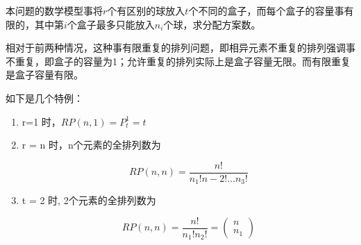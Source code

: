 \documentclass{article}
\begin{document}
本问题的数学模型事将$r$个有区别的球放入$t$个不同的盒子，而每个盒子的容量事有限的，其中第$i$个盒子最多只能放入$n_i$个球，求分配方案数。

相对于前两种情况，这种事有限重复的排列问题，即相异元素不重复的排列强调事不重复，即盒子的容量为1；允许重复的排列实际上是盒子容量无限。而有限重复是盒子容量有限。

如下是几个特例：

\begin{enumerate}
    \item r=1 时，$RP(n,1)=P^1_t = t$
    \item r = n 时，n个元素的全排列数为

    \begin{equation}
        RP(n,n) = \frac{n!}{n_1!n-2!\dots n_3!}
    \end{equation}

    \item t = 2 时, 2个元素的全排列数为
    
    \begin{equation}
        RP(n,n) = \frac{n!}{n_1!n_2!} = \begin{pmatrix}
            n \\ n_1
        \end{pmatrix}
    \end{equation}
\end{enumerate}
\end{document}
